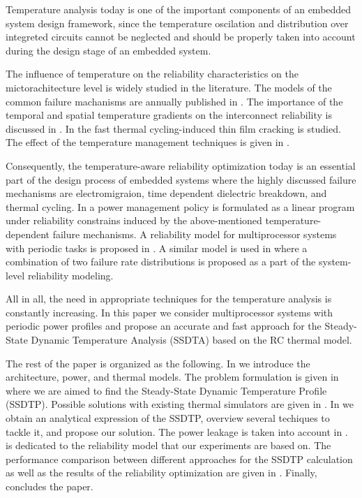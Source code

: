 Temperature analysis today is one of the important components of an embedded system design framework, since the temperature oscilation and distribution over integreted circuits cannot be neglected and should be properly taken into account during the design stage of an embedded system.





The influence of temperature on the reliability characteristics on the mictorachitecture level is widely studied in the literature. The models of the common failure machanisms are annually published in \cite{jedec2010}. The importance of the temporal and spatial temperature gradients on the interconnect reliability is discussed in \cite{lu2004}. In \cite{hieu2004} the fast thermal cycling-induced thin film cracking is studied. The effect of the temperature management techniques is given in \cite{srinivasan2003}.

Consequently, the temperature-aware reliability optimization today is an essential part of the design process of embedded systems where the highly discussed failure mechanisms are electromigraion, time dependent dielectric breakdown, and thermal cycling. In \cite{coskun2006} a power management policy is formulated as a linear program under reliability constrains induced by the above-mentioned temperature-dependent failure mechanisms. A reliability model for multiprocessor systems with periodic tasks is proposed in \cite{huang2009}. A similar model is used in \cite{xiang2010} where a combination of two failure rate distributions is proposed as a part of the system-level reliability modeling.

All in all, the need in appropriate techniques for the temperature analysis is constantly increasing. In this paper we consider multiprocessor systems with periodic power profiles and propose an accurate and fast approach for the Steady-State Dynamic Temperature Analysis (SSDTA) based on the RC thermal model.

The rest of the paper is organized as the following. In  we introduce the architecture, power, and thermal models. The problem formulation is given in  where we are aimed to find the Steady-State Dynamic Temperature Profile (SSDTP). Possible solutions with existing thermal simulators are given in . In  we obtain an analytical expression of the SSDTP, overview several techiques to tackle it, and propose our solution. The power leakage is taken into account in .  is dedicated to the reliability model that our experiments are based on. The performance comparison between different approaches for the SSDTP calculation as well as the results of the reliability optimization are given in . Finally,  concludes the paper.
